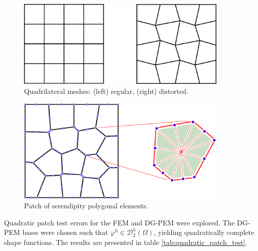 \begin{figure}[!h]
    \centering
    \includegraphics[width=4.0in]{figures/quadrilateral_patch_meshes.pdf}
    	\caption{Quadrilateral meshes: (left) regular, (right) distorted.}
    \label{fig:quadrilateral_patch_meshes}
\end{figure}

\begin{figure}[!h]
    \centering
    \includegraphics[width=4.0in]{figures/quadratic_polygonal_patch_mesh.pdf}
    	\caption{Patch of serendipity polygonal elements.}
    \label{fig:quadratic_polygonal_patch_mesh}
\end{figure}

Quadratic patch test errors for the FEM and DG-PEM were explored. The DG-PEM bases were chosen such that $\varphi^h \in \mathcal{D}^h_2 (\Omega)$, yielding quadratically complete shape functions. The results are presented in table \ref{tab:quadratic_patch_test}.

